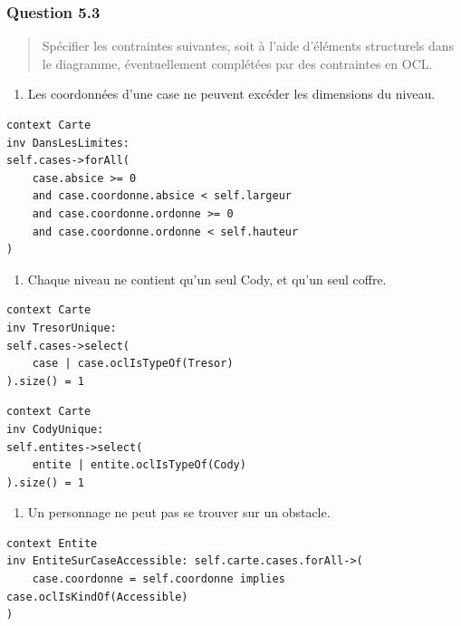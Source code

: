 \documentclass[]{article}
\providecommand{\tightlist}{%
  \setlength{\itemsep}{0pt}\setlength{\parskip}{0pt}}
\begin{document}
\hypertarget{question-5.3}{%
\subsubsection{Question 5.3}\label{question-5.3}}

\begin{quote}
Spécifier les contraintes suivantes, soit à l'aide d'éléments
structurels dans le diagramme, éventuellement complétées par des
contraintes en OCL.
\end{quote}

\begin{enumerate}
\def\labelenumi{\arabic{enumi})}
\tightlist
\item
  Les coordonnées d'une case ne peuvent excéder les dimensions du
  niveau.
\end{enumerate}

\begin{verbatim}
context Carte
inv DansLesLimites:
self.cases->forAll(
    case.absice >= 0
    and case.coordonne.absice < self.largeur
    and case.coordonne.ordonne >= 0
    and case.coordonne.ordonne < self.hauteur
)
\end{verbatim}

\begin{enumerate}
\def\labelenumi{\arabic{enumi})}
\setcounter{enumi}{1}
\tightlist
\item Chaque niveau ne contient qu'un seul Cody, et qu'un seul coffre.
\end{enumerate}

\begin{verbatim}
context Carte
inv TresorUnique:
self.cases->select(
    case | case.oclIsTypeOf(Tresor)
).size() = 1
\end{verbatim}

\begin{verbatim}
context Carte
inv CodyUnique:
self.entites->select(
    entite | entite.oclIsTypeOf(Cody)
).size() = 1
\end{verbatim}

\begin{enumerate}
\def\labelenumi{\arabic{enumi})}
\setcounter{enumi}{2}
\tightlist
\item
  Un personnage ne peut pas se trouver sur un obstacle.
\end{enumerate}

\begin{verbatim}
context Entite
inv EntiteSurCaseAccessible: self.carte.cases.forAll->(
    case.coordonne = self.coordonne implies case.oclIsKindOf(Accessible)
)
\end{verbatim}
\end{document}
